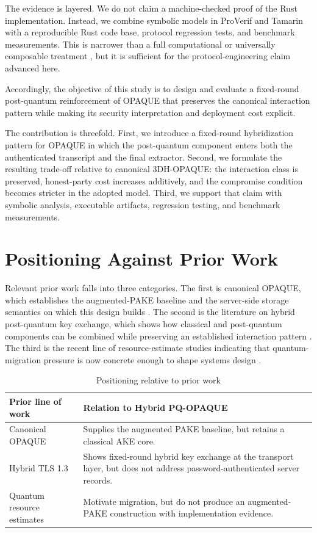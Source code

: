 \documentclass[conference]{IEEEtran}
\begin{document}
The evidence is layered. We do not claim a machine-checked proof of the Rust implementation. Instead, we combine symbolic models in ProVerif and Tamarin with a reproducible Rust code base, protocol regression tests, and benchmark measurements. This is narrower than a full computational or universally composable treatment \cite{canetti2001}, but it is sufficient for the protocol-engineering claim advanced here.

Accordingly, the objective of this study is to design and evaluate a fixed-round post-quantum reinforcement of OPAQUE that preserves the canonical interaction pattern while making its security interpretation and deployment cost explicit.

The contribution is threefold. First, we introduce a fixed-round hybridization pattern for OPAQUE in which the post-quantum component enters both the authenticated transcript and the final extractor. Second, we formulate the resulting trade-off relative to canonical 3DH-OPAQUE: the interaction class is preserved, honest-party cost increases additively, and the compromise condition becomes stricter in the adopted model. Third, we support that claim with symbolic analysis, executable artifacts, regression testing, and benchmark measurements.

\section{Positioning Against Prior Work}

Relevant prior work falls into three categories. The first is canonical OPAQUE, which establishes the augmented-PAKE baseline and the server-side storage semantics on which this design builds \cite{jarecki2018,ietf-opaque}. The second is the literature on hybrid post-quantum key exchange, which shows how classical and post-quantum components can be combined while preserving an established interaction pattern \cite{tlshybrid2025}. The third is the recent line of resource-estimate studies indicating that quantum-migration pressure is now concrete enough to shape systems design \cite{babbush2026}.

\begin{table}[t]
\caption{Positioning relative to prior work}
\label{tab:acit-positioning}
\centering
\footnotesize
\begin{tabularx}{\columnwidth}{@{}L{2.4cm}Y@{}}
\toprule
Prior line of work & Relation to Hybrid PQ-OPAQUE \\
\midrule
Canonical OPAQUE & Supplies the augmented PAKE baseline, but retains a classical AKE core. \\
Hybrid TLS 1.3 & Shows fixed-round hybrid key exchange at the transport layer, but does not address password-authenticated server records. \\
Quantum resource estimates & Motivate migration, but do not produce an augmented-PAKE construction with implementation evidence. \\
\bottomrule
\end{tabularx}
\end{table}
\end{document}
